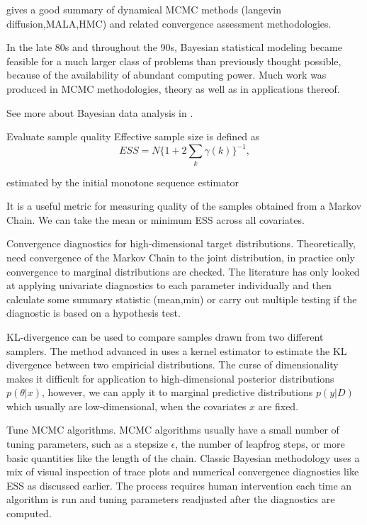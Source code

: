 \documentclass[]{report}
\begin{document}
\cite{green2015bayesian} gives a good summary of dynamical MCMC methods (langevin diffusion,MALA,HMC) and related convergence assessment methodologies.

In the late 80s and throughout the 90s, Bayesian statistical modeling became
feasible for a much larger class of problems than previously thought possible,
because of the availability of abundant computing power. Much work was produced
in MCMC methodologies\cite{robert2013monte}, theory\cite{tierney1994markov,roberts2004general} as well as in applications thereof.  



See more about Bayesian data analysis in \cite{gelman2014bayesian}. 


Evaluate sample quality
Effective sample size is defined as 
\[ ESS = N \{ 1 + 2 \sum_k \gamma(k) \}^{-1}, \]

estimated by the initial
monotone sequence estimator \cite{geyer1992practical}

It is a useful metric for measuring quality of the samples obtained from a
Markov Chain. We can take the mean or minimum ESS across all covariates.

Convergence diagnostics for high-dimensional target distributions. Theoretically, need convergence of the Markov Chain to the joint distribution, in practice only convergence to marginal distributions are checked. The literature has only looked at applying univariate diagnostics to each parameter individually and then calculate some summary statistic (mean,min) or carry out multiple testing if the diagnostic is based on a hypothesis test.

KL-divergence can be used to compare samples drawn from two different samplers.
The method advanced in \cite{boltz2007knn,boltz2007high} uses a kernel estimator to estimate the KL divergence between two empiricial distributions. The curse of dimensionality makes it difficult for application to high-dimensional posterior distributions $p(\theta|x)$, however, we can apply it to marginal predictive distributions $p(y|D)$ which usually are low-dimensional, when the covariates $x$ are fixed.

Tune MCMC algorithms. MCMC algorithms usually have a small number of tuning
parameters, such as a stepsize $\epsilon$, the number of leapfrog steps, or more
basic quantities like the length of the chain. Classic Bayesian methodology
\cite{robert2013monte} uses a mix of visual inspection of trace plots and
numerical convergence diagnostics like ESS as discussed earlier. The process
requires human intervention each time an algorithm is run and tuning parameters
readjusted after the diagnostics are computed. 
\end{document}
